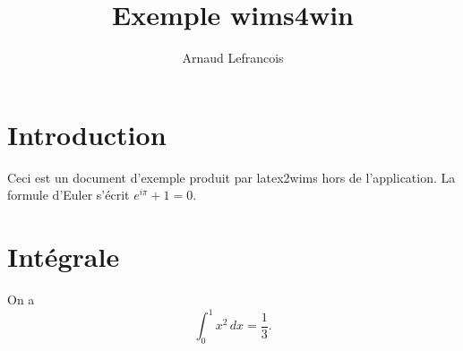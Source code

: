 \documentclass[11pt]{article}
\begin{document}
\title{Exemple wims4win}
\author{Arnaud Lefrancois}
\section{Introduction}
Ceci est un document d'exemple produit par latex2wims hors de l'application.
La formule d'Euler s'écrit \(e^{i\pi}+1=0\).
\section{Intégrale}
On a
\[ \int_0^1 x^2\,dx = \frac{1}{3}. \]
\end{document}
